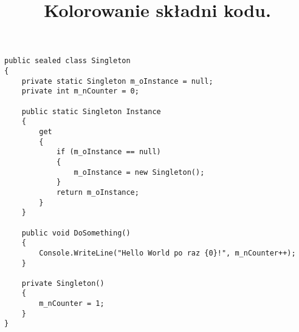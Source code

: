﻿\documentclass[11pt,a4paper]{article}
\title{Kolorowanie składni kodu.}
\author{}                   		 	                    %
\date{}                                     		        %
\begin{document}
\maketitle  %

\begin{lstlisting}
public sealed class Singleton    
{
    private static Singleton m_oInstance = null;
    private int m_nCounter = 0;
 
    public static Singleton Instance
    {
        get
        {
            if (m_oInstance == null)
            {
                m_oInstance = new Singleton();
            }
            return m_oInstance;
        }
    }
 
    public void DoSomething()
    {
        Console.WriteLine("Hello World po raz {0}!", m_nCounter++);
    }
 
    private Singleton()
    {
        m_nCounter = 1;
    }
}
    \end{lstlisting}
\end{document}
